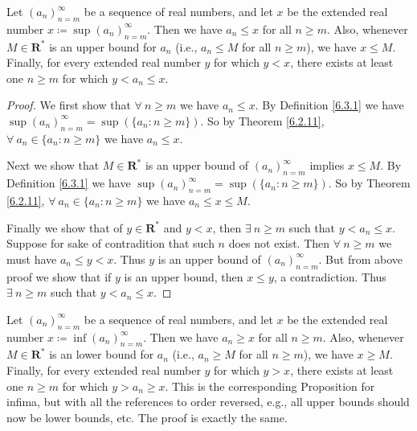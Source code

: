 \setcounter{theorem}{5}
\begin{proposition}\label{6.3.6}
Let \((a_n)_{n = m}^\infty\) be a sequence of real numbers, and let \(x\) be the extended real number \(x \coloneqq \sup(a_n)_{n = m}^\infty\).
Then we have \(a_n \leq x\) for all \(n \geq m\).
Also, whenever \(M \in \mathbf{R}^*\) is an upper bound for \(a_n\) (i.e., \(a_n \leq M\) for all \(n \geq m\)), we have \(x \leq M\).
Finally, for every extended real number \(y\) for which \(y < x\), there exists at least one \(n \geq m\) for which \(y < a_n \leq x\).
\end{proposition}

\begin{proof}
We first show that \(\forall\ n \geq m\) we have \(a_n \leq x\).
By Definition \ref{6.3.1} we have \(\sup(a_n)_{n = m}^\infty = \sup(\{a_n : n \geq m\})\).
So by Theorem \ref{6.2.11}, \(\forall\ a_n \in \{a_n : n \geq m\}\) we have \(a_n \leq x\).

Next we show that \(M \in \mathbf{R}^*\) is an upper bound of \((a_n)_{n = m}^\infty\) implies \(x \leq M\).
By Definition \ref{6.3.1} we have \(\sup(a_n)_{n = m}^\infty = \sup(\{a_n : n \geq m\})\).
So by Theorem \ref{6.2.11}, \(\forall\ a_n \in \{a_n : n \geq m\}\) we have \(a_n \leq x \leq M\).

Finally we show that of \(y \in \mathbf{R}^*\) and \(y < x\), then \(\exists\ n \geq m\) such that \(y < a_n \leq x\).
Suppose for sake of contradition that such \(n\) does not exist.
Then \(\forall\ n \geq m\) we must have \(a_n \leq y < x\).
Thus \(y\) is an upper bound of \((a_n)_{n = m}^\infty\).
But from above proof we show that if \(y\) is an upper bound, then \(x \leq y\), a contradiction.
Thus \(\exists\ n \geq m\) such that \(y < a_n \leq x\).
\end{proof}

\begin{remark}\label{6.3.7}
Let \((a_n)_{n = m}^\infty\) be a sequence of real numbers, and let \(x\) be the extended real number \(x \coloneqq \inf(a_n)_{n = m}^\infty\).
Then we have \(a_n \geq x\) for all \(n \geq m\).
Also, whenever \(M \in \mathbf{R}^*\) is an lower bound for \(a_n\) (i.e., \(a_n \geq M\) for all \(n \geq m\)), we have \(x \geq M\).
Finally, for every extended real number \(y\) for which \(y > x\), there exists at least one \(n \geq m\) for which \(y > a_n \geq x\).
This is the corresponding Proposition for infima, but with all the references to order reversed, e.g., all upper bounds should now be lower bounds, etc.
The proof is exactly the same.
\end{remark}


